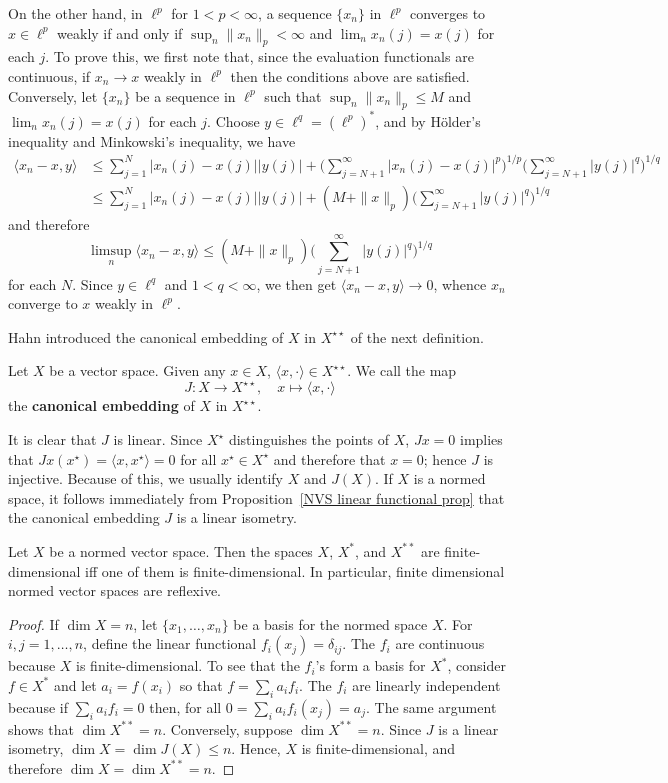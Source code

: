 \begin{example}
On the other hand, in $\ell^p$ for $1<p<\infty$, a sequence $\{x_n\}$ in $\ell^p$ converges to $x\in\ell^p$ weakly if and only if $\sup_n\|x_n\|_p<\infty$ and $\lim_nx_n(j)=x(j)$ for each $j$. To prove this, we first note that, since the evaluation functionals are continuous, if $x_n\to x$ weakly in $\ell^p$ then the conditions above are satisfied. Conversely, let $\{x_n\}$ be a sequence in $\ell^p$ such that $\sup_n\|x_n\|_p\leq M$ and $\lim_nx_n(j)=x(j)$ for each $j$. Choose $y\in\ell^q=(\ell^p)^*$, and by H\"older's inequality and Minkowski's inequality, we have
\begin{align*}
\langle x_n-x,y\rangle&\leq\sum_{j=1}^{N}|x_n(j)-x(j)||y(j)|+\Big(\sum_{j=N+1}^{\infty}|x_n(j)-x(j)|^p\Big)^{1/p}\Big(\sum_{j=N+1}^{\infty}|y(j)|^q\Big)^{1/q}\\
&\leq\sum_{j=1}^{N}|x_n(j)-x(j)||y(j)|+(M+\|x\|_p)\Big(\sum_{j=N+1}^{\infty}|y(j)|^q\Big)^{1/q}
\end{align*}
and therefore
\[\limsup_n\langle x_n-x,y\rangle\leq(M+\|x\|_p)\Big(\sum_{j=N+1}^{\infty}|y(j)|^q\Big)^{1/q}\]
for each $N$. Since $y\in\ell^q$ and $1<q<\infty$, we then get $\langle x_n-x,y\rangle\to 0$, whence $x_n$ converge to $x$ weakly in $\ell^p$.
\end{example}
Hahn introduced the canonical embedding of $X$ in $X^{\star\star}$ of the next definition.
\begin{definition}
Let $X$ be a vector space. Given any $x\in X$, $\langle x,\cdot\rangle\in X^{\star\star}$. We call the map
\[J:X\to X^{\star\star},\quad x\mapsto\langle x,\cdot\rangle\]
the \textbf{canonical embedding} of $X$ in $X^{\star\star}$.
\end{definition}
It is clear that $J$ is linear. Since $X^{\star}$ distinguishes the points of $X$, $Jx=0$ implies that $Jx(x^{\star})=\langle x,x^{\star}\rangle=0$ for all $x^{\star}\in X^{\star}$ and therefore that $x=0$; hence $J$ is injective. Because of this, we usually identify $X$ and $J(X)$. If $X$ is a normed space, it follows immediately from Proposition~\ref{NVS linear functional prop} that the canonical embedding $J$ is a linear isometry.
\begin{proposition}
Let $X$ be a normed vector space. Then the spaces $X$, $X^*$, and $X^{**}$ are finite-dimensional iff one of them is finite-dimensional. In particular, finite dimensional normed vector spaces are reflexive.
\end{proposition}
\begin{proof}
If $\dim X=n$, let $\{x_1,\dots,x_n\}$ be a basis for the normed space $X$. For $i,j=1,\dots,n$, define the linear functional $f_i(x_j)=\delta_{ij}$. The $f_i$ are continuous because $X$ is finite-dimensional. To see that the $f_i$'s form a basis for $X^*$, consider $f\in X^*$ and let $a_i=f(x_i)$ so that $f=\sum_ia_if_i$. The $f_i$ are linearly independent because if $\sum_ia_if_i=0$ then, for all $0=\sum_ia_if_i(x_j)=a_j$. The same argument shows that $\dim X^{**}=n$. Conversely, suppose $\dim X^{**}=n$. Since $J$ is a linear isometry, $\dim X=\dim J(X)\leq n$. Hence, $X$ is finite-dimensional, and therefore $\dim X=\dim X^{**}=n$.
\end{proof}
